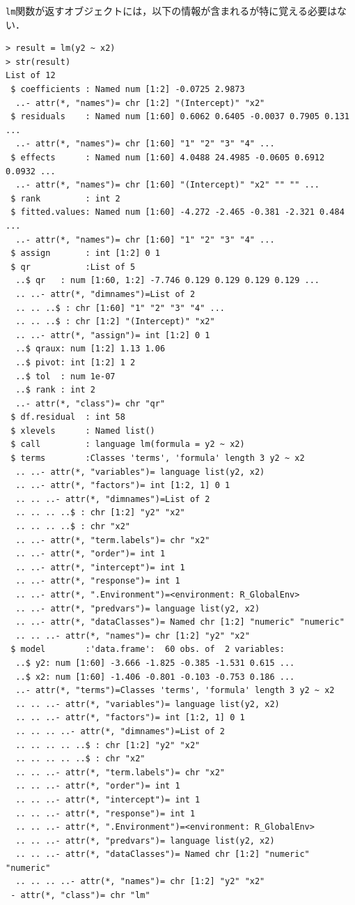 \verb+lm+関数が返すオブジェクトには，以下の情報が含まれるが特に覚える必要はない．
\begin{breakbox}
\begin{verbatim}
> result = lm(y2 ~ x2)
> str(result)
List of 12
 $ coefficients : Named num [1:2] -0.0725 2.9873
  ..- attr(*, "names")= chr [1:2] "(Intercept)" "x2"
 $ residuals    : Named num [1:60] 0.6062 0.6405 -0.0037 0.7905 0.131 ...
  ..- attr(*, "names")= chr [1:60] "1" "2" "3" "4" ...
 $ effects      : Named num [1:60] 4.0488 24.4985 -0.0605 0.6912 0.0932 ...
  ..- attr(*, "names")= chr [1:60] "(Intercept)" "x2" "" "" ...
 $ rank         : int 2
 $ fitted.values: Named num [1:60] -4.272 -2.465 -0.381 -2.321 0.484 ...
  ..- attr(*, "names")= chr [1:60] "1" "2" "3" "4" ...
 $ assign       : int [1:2] 0 1
 $ qr           :List of 5
  ..$ qr   : num [1:60, 1:2] -7.746 0.129 0.129 0.129 0.129 ...
  .. ..- attr(*, "dimnames")=List of 2
  .. .. ..$ : chr [1:60] "1" "2" "3" "4" ...
  .. .. ..$ : chr [1:2] "(Intercept)" "x2"
  .. ..- attr(*, "assign")= int [1:2] 0 1
  ..$ qraux: num [1:2] 1.13 1.06
  ..$ pivot: int [1:2] 1 2
  ..$ tol  : num 1e-07
  ..$ rank : int 2
  ..- attr(*, "class")= chr "qr"
 $ df.residual  : int 58
 $ xlevels      : Named list()
 $ call         : language lm(formula = y2 ~ x2)
 $ terms        :Classes 'terms', 'formula' length 3 y2 ~ x2
  .. ..- attr(*, "variables")= language list(y2, x2)
  .. ..- attr(*, "factors")= int [1:2, 1] 0 1
  .. .. ..- attr(*, "dimnames")=List of 2
  .. .. .. ..$ : chr [1:2] "y2" "x2"
  .. .. .. ..$ : chr "x2"
  .. ..- attr(*, "term.labels")= chr "x2"
  .. ..- attr(*, "order")= int 1
  .. ..- attr(*, "intercept")= int 1
  .. ..- attr(*, "response")= int 1
  .. ..- attr(*, ".Environment")=<environment: R_GlobalEnv> 
  .. ..- attr(*, "predvars")= language list(y2, x2)
  .. ..- attr(*, "dataClasses")= Named chr [1:2] "numeric" "numeric"
  .. .. ..- attr(*, "names")= chr [1:2] "y2" "x2"
 $ model        :'data.frame':	60 obs. of  2 variables:
  ..$ y2: num [1:60] -3.666 -1.825 -0.385 -1.531 0.615 ...
  ..$ x2: num [1:60] -1.406 -0.801 -0.103 -0.753 0.186 ...
  ..- attr(*, "terms")=Classes 'terms', 'formula' length 3 y2 ~ x2
  .. .. ..- attr(*, "variables")= language list(y2, x2)
  .. .. ..- attr(*, "factors")= int [1:2, 1] 0 1
  .. .. .. ..- attr(*, "dimnames")=List of 2
  .. .. .. .. ..$ : chr [1:2] "y2" "x2"
  .. .. .. .. ..$ : chr "x2"
  .. .. ..- attr(*, "term.labels")= chr "x2"
  .. .. ..- attr(*, "order")= int 1
  .. .. ..- attr(*, "intercept")= int 1
  .. .. ..- attr(*, "response")= int 1
  .. .. ..- attr(*, ".Environment")=<environment: R_GlobalEnv> 
  .. .. ..- attr(*, "predvars")= language list(y2, x2)
  .. .. ..- attr(*, "dataClasses")= Named chr [1:2] "numeric" "numeric"
  .. .. .. ..- attr(*, "names")= chr [1:2] "y2" "x2"
 - attr(*, "class")= chr "lm"
\end{verbatim}
\end{breakbox}
